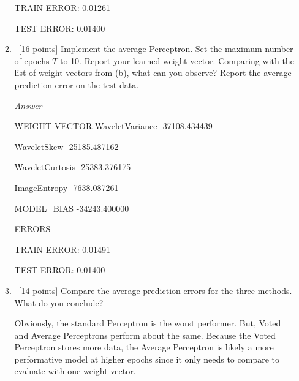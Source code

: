 \documentclass[12pt, fullpage,letterpaper]{article}
\begin{document}
\begin{enumerate}
\begin{enumerate}
	TRAIN ERROR:  0.01261
	
    TEST ERROR:   0.01400
	
	\item~[16 points] Implement the average Perceptron. Set the maximum number of epochs $T$ to 10. Report your learned weight vector. Comparing with the list of weight vectors from (b), what can you observe? Report the average prediction error on the test data. 
	
	\emph{Answer}
	
	WEIGHT VECTOR
	WaveletVariance   -37108.434439
	
    WaveletSkew       -25185.487162
    
    WaveletCurtosis   -25383.376175
    
    ImageEntropy       -7638.087261
    
    MODEL\_BIAS        -34243.400000
    
    ERRORS
	
	TRAIN ERROR:  0.01491
    
    TEST ERROR:   0.01400
	
	\item~[14 points] Compare the average prediction errors for the three methods. What do you conclude? 
	
	Obviously, the standard Perceptron is the worst performer. But, Voted and Average Perceptrons perform about the same. Because the Voted Perceptron stores more data, the Average Perceptron is likely a more performative model at higher epochs since it only needs to compare to evaluate with one weight vector.
	
\end{enumerate}


\end{enumerate}
\end{document}

